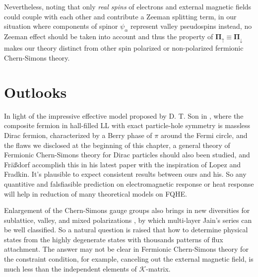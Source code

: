 \documentclass[bachelor,english,numbers]{ustcthesis}
\begin{document}
		Nevertheless, noting that only \emph{real spins} of electrons and external magnetic fields could couple with each other and contribute a Zeeman splitting term, in our situation where components of spinor $\psi_\alpha$ represent valley pseudospins instead, no Zeeman effect should be taken into account and thus the property of $\bm{\Pi}_\uparrow\equiv\bm{\Pi}_\downarrow$ makes our theory distinct from other spin polarized or non-polarized fermionic Chern-Simons theory.

	\section{Outlooks}
		\indent\par

		In light of the impressive effective model proposed by D. T. Son in \cite{son2015composite}, where the composite fermion in hall-filled LL with exact particle-hole symmetry is massless Dirac fermion, characterized by a Berry phase of $\pi$ around the Fermi circle, and the flaws we disclosed at the beginning of this chapter, a general theory of Fermionic Chern-Simons theory for Dirac particles should also been studied, and Fr{\"a}{\ss}dorf accomplish this in his latest paper \cite{frassdorf2018abelian} with the inspiration of Lopez and Fradkin. It's plausible to expect consistent results between ours and his. So any quantitive and falsfiasible prediction on electromagnetic response or heat response will help in reduction of many theoretical models on FQHE.\par
		
		Enlargement of the Chern-Simons gauge groups also brings in new diversities for sublattice, valley, and mixed polarizations \cite{modak2011fermionic}, by which multi-layer Jain's series can be well classified. So a natural question is raised that how to determine physical states from the highly degenerate states with thousands patterns of flux attachment. The answer may not be clear in Fermionic Chern-Simons theory for the constraint condition, for example, canceling out the external magnetic field, is much less than the independent elements of $\mathcal{K}$-matrix.\par


\appendix
\end{document}
